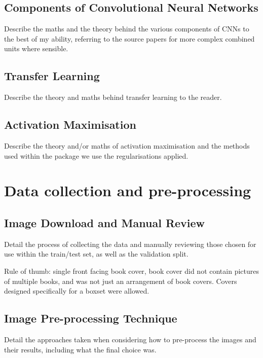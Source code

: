 \documentclass[12pt]{article}
\numberwithin{equation}{section}
\numberwithin{figure}{section}
\begin{document}
\subsection{Components of Convolutional Neural Networks} 
\label{sub:Components_of_Convolutional_Neural_Networks} 
Describe the maths and the theory behind the various components of CNNs to the best of my ability, referring to the source papers for more complex combined units where sensible. 
\subsection{Transfer Learning} 
\label{sub:Transfer_Learning} 
Describe the theory and maths behind transfer learning to the reader.

\subsection{Activation Maximisation} 
\label{sub:Activation_Maximisation} 
Describe the theory and/or maths of activation maximisation and the methods used within the package we use the regularisations applied. 
\section{Data collection and pre-processing} 
\label{sec:Data_collection_and_pre-processing} 
\subsection{Image Download and Manual Review} 
\label{sub:Image Download and Manual Review} 
Detail the process of collecting the data and manually reviewing those chosen for use within the train/test set, as well as the validation split.

Rule of thumb: single front facing book cover, book cover did not contain pictures of multiple books, and was not just an arrangement of book covers. Covers designed specifically for a boxset were allowed.
\subsection{Image Pre-processing Technique} 
\label{sub:Image_Pre-processing_Technique} 
Detail the approaches taken when considering how to pre-process the images and their results, including what the final choice was.
\end{document}

